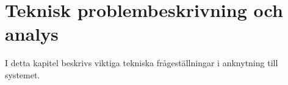 \chapter{Teknisk problembeskrivning och analys}
I detta kapitel beskrivs viktiga tekniska frågeställningar i anknytning till systemet.












